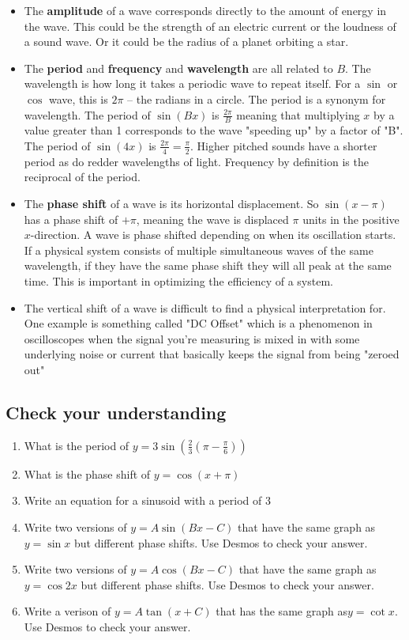 \documentclass{article}
\begin{document}
\begin{multicols}{2}
\begin{itemize}
	\item The \textbf{amplitude} of a wave corresponds directly to the amount of energy in the wave. This could be the strength of an electric current or the loudness of a sound wave. Or it could be the radius of a planet orbiting a star.
	\item The \textbf{period} and \textbf{frequency} and \textbf{wavelength} are all related to $B$. The wavelength is how long it takes a periodic wave to repeat itself. For a $\sin$ or $\cos$ wave, this is $2\pi$ -- the radians in a circle. The period is a synonym for wavelength. The period of $\sin(Bx)$ is $\frac{2\pi}{B}$ meaning that multiplying $x$ by a value greater than 1 corresponds to the wave "speeding up" by a factor of "B". The period of $\sin(4x)$ is $\frac{2\pi}{4} = \frac{\pi}{2}$. Higher pitched sounds have a shorter period as do redder wavelengths of light. Frequency by definition is the reciprocal of the period.
	\item The \textbf{phase shift} of a wave is its horizontal displacement. So $\sin(x-\pi)$ has a phase shift of $+\pi$, meaning the wave is displaced $\pi$ units in the positive $x$-direction. A wave is phase shifted depending on when its oscillation starts. If a physical system consists of multiple simultaneous waves of the same wavelength, if they have the same phase shift they will all peak at the same time. This is important in optimizing the efficiency of a system.
	\item The vertical shift of a wave is difficult to find a physical interpretation for. One example is something called "DC Offset" which is a phenomenon in oscilloscopes when the signal you're measuring is mixed in with some underlying noise or current that basically keeps the signal from being "zeroed out"
\end{itemize}

\subsection*{Check your understanding}

\begin{enumerate}
	\item What is the period of $y=3 \sin (\frac23(\pi-\frac{\pi}{6}))$
	\item What is the phase shift of $y=\cos(x+\pi)$
	\item Write an equation for a sinusoid with a period of 3
	\item Write two versions of $y=A\sin (Bx-C)$ that have the same graph as $y=\sin x$ but different phase shifts. Use Desmos to check your answer.
	\item  Write two versions of $y=A\cos (Bx-C)$ that have the same graph as $y=\cos 2x$ but different phase shifts. Use Desmos to check your answer.
	\item Write a verison of $y=A\tan(x+C)$ that has the same graph as$y=\cot x$. Use Desmos to check your answer.
\end{enumerate}
\end{multicols}
\end{document}
